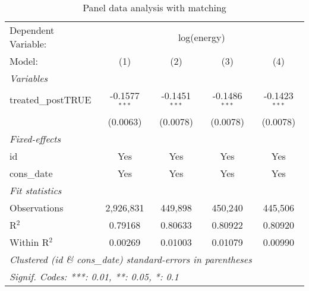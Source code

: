 
\begin{table}[htbp]
   \caption{Panel data analysis with matching\label{tab:didmatch}}
   \centering
   \begin{tabular}{lcccc}
      \tabularnewline \midrule \midrule
      Dependent Variable: & \multicolumn{4}{c}{log(energy)}\\
      Model:             & (1)             & (2)             & (3)             & (4)\\  
      \midrule
      \emph{Variables}\\
      treated\_postTRUE  & -0.1577$^{***}$ & -0.1451$^{***}$ & -0.1486$^{***}$ & -0.1423$^{***}$\\   
                         & (0.0063)        & (0.0078)        & (0.0078)        & (0.0078)\\   
      \midrule
      \emph{Fixed-effects}\\
      id                 & Yes             & Yes             & Yes             & Yes\\  
      cons\_date         & Yes             & Yes             & Yes             & Yes\\  
      \midrule
      \emph{Fit statistics}\\
      Observations       & 2,926,831       & 449,898         & 450,240         & 445,506\\  
      R$^2$              & 0.79168         & 0.80633         & 0.80922         & 0.80920\\  
      Within R$^2$       & 0.00269         & 0.01003         & 0.01079         & 0.00990\\  
      \midrule \midrule
      \multicolumn{5}{l}{\emph{Clustered (id \& cons\_date) standard-errors in parentheses}}\\
      \multicolumn{5}{l}{\emph{Signif. Codes: ***: 0.01, **: 0.05, *: 0.1}}\\
   \end{tabular}
\end{table}



